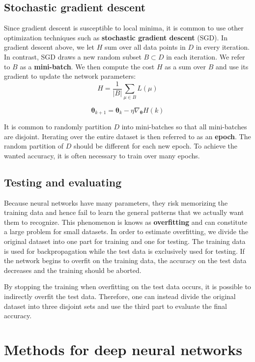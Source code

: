 \subsection{Stochastic gradient descent}

Since gradient descent is susceptible to local minima, it is common to use other optimization techniques such as \textbf{stochastic gradient descent} (SGD).
In gradient descent above, we let $H$ sum over all data points in $D$ in every iteration. In contrast, SGD draws a new random subset $B \subset D$ in each iteration. We refer to $B$ as a \textbf{mini-batch}. We then compute the cost $H$ as a sum over $B$ and use its gradient to update the network parameters:
\[
H = \frac{1}{\vert B \vert} \sum_{\mu \in B} L(\mu)
\]

\[
\mathbf{\theta}_{k+1} =
\mathbf{\theta}_k - \eta \nabla_{\mathbf{\theta}} H(k)
\]

It is common to randomly partition $D$ into mini-batches so that all mini-batches are disjoint. Iterating over the entire dataset is then referred to as an \textbf{epoch}.
The random partition of $D$ should be different for each new epoch.
To achieve the wanted accuracy, it is often necessary to train over many epochs.


\subsection{Testing and evaluating}

Because neural networks have many parameters, they risk memorizing the training data and hence fail to learn the general patterns that we actually want them to recognize.
This phenomenon is knows as \textbf{overfitting} and can constitute a large problem for small datasets. In order to estimate overfitting, we divide the original dataset into one part for training and one for testing. The training data is used for backpropagation while the test data is exclusively used for testing. If the network begins to overfit on the training data, the accuracy on the test data decreases and the training should be aborted.

By stopping the training when overfitting on the test data occurs, it is possible to indirectly overfit the test data. Therefore, one can instead divide the original dataset into three disjoint sets and use the third part to evaluate the final accuracy.


\section{Methods for deep neural networks}

